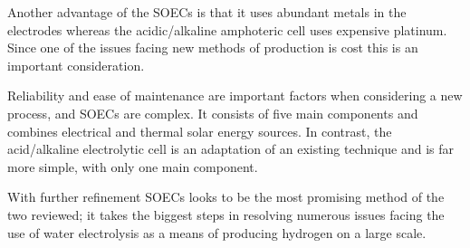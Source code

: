 Another advantage of the SOECs is that it uses abundant metals in the electrodes whereas the acidic/alkaline amphoteric cell uses expensive platinum.
Since one of the issues facing new methods of  production is cost this is an important consideration.

Reliability and ease of maintenance are important factors when considering a new process, and SOECs are complex.
It consists of five main components and combines electrical and thermal solar energy sources.
In contrast, the acid/alkaline electrolytic cell is an adaptation of an existing technique and is far more simple, with only one main component.

With further refinement SOECs looks to be the most promising method of the two reviewed; it takes the biggest steps in resolving numerous issues facing the use of water electrolysis as a means of producing hydrogen on a large scale.

